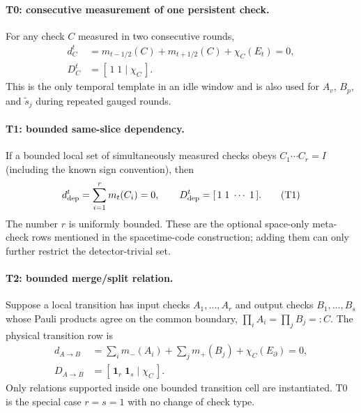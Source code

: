 \documentclass[aps,prx,reprint,superscriptaddress,nofootinbib,floatfix,longbibliography]{revtex4-2}
\theoremstyle{definition}
\begin{document}
\paragraph{T0: consecutive measurement of one persistent check.}
For any check $C$ measured in two consecutive rounds,
\begin{align}
 d_C^t&=m_{t-1/2}(C)+m_{t+1/2}(C)+\chi_C(E_t)=0,
 \tag{T0a}\\
 D_C^t&=[\,1\;1\mid\chi_C\,].
 \tag{T0b}
\end{align}
This is the only temporal template in an idle window and is also used for
$A_v$, $B_p$, and $\widetilde s_j$ during repeated gauged rounds.

\paragraph{T1: bounded same-slice dependency.}
If a bounded local set of simultaneously measured checks obeys
$C_1\cdots C_r=I$ (including the known sign convention), then
\begin{equation}
 d_{\rm dep}^t=\sum_{i=1}^r m_t(C_i)=0,
 \qquad D_{\rm dep}^t=[\,1\;1\;\cdots\;1\,].
 \tag{T1}
\end{equation}
The number $r$ is uniformly bounded.  These are the optional space-only
meta-check rows mentioned in the spacetime-code construction; adding them can
only further restrict the detector-trivial set.

\paragraph{T2: bounded merge/split relation.}
Suppose a local transition has input checks $A_1,\ldots,A_r$ and output checks
$B_1,\ldots,B_s$ whose Pauli products agree on the common boundary,
$\prod_iA_i=\prod_jB_j=:C$.  The physical transition row is
\begin{align}
 d_{A\to B}&=\sum_i m_-(A_i)+\sum_j m_+(B_j)
   +\chi_C(E_\partial)=0,
 \tag{T2a}\\
 D_{A\to B}&=[\,\mathbf1_r\;\mathbf1_s\mid\chi_C\,].
 \tag{T2b}
\end{align}
Only relations supported inside one bounded transition cell are instantiated.
T0 is the special case $r=s=1$ with no change of check type.
\end{document}
